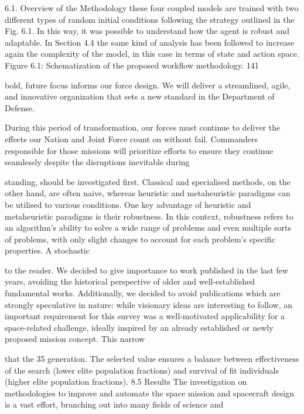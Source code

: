 \documentclass[a4paper,12pt]{article}
\begin{document}
6.1.
Overview of the Methodology
these four coupled models are trained with two different types of random initial
conditions following the strategy outlined in the Fig. 6.1. In this way, it was
possible to understand how the agent is robust and adaptable. In Section 4.4
the same kind of analysis has been followed to increase again the complexity
of the model, in this case in terms of state and action space.
Figure 6.1: Schematization of the proposed workflow methodology.
141

bold, future focus informs our force design. We will 
deliver a streamlined, agile, and innovative organization 
that sets a new standard in the Department of Defense. 
 
During this period of transformation, our forces must 
continue to deliver the effects our Nation and Joint Force 
count on without fail. Commanders responsible for those 
missions will prioritize efforts to ensure they continue 
seamlessly despite the disruptions inevitable during

standing, should be investigated first. Classical and specialised methods, 
on the other hand, are often naive, whereas heuristic and metaheuristic 
paradigms can be utilised to various conditions. One key advantage of 
heuristic and metaheuristic paradigms is their robustness. In this 
context, robustness refers to an algorithm’s ability to solve a wide range 
of problems and even multiple sorts of problems, with only slight 
changes to account for each problem’s specific properties. A stochastic

to the reader. We decided to give importance to work published in the last few years,
avoiding the historical perspective of older and well-established fundamental works.
Additionally, we decided to avoid publications which are strongly speculative in
nature: while visionary ideas are interesting to follow, an important requirement for
this survey was a well-motivated applicability for a space-related challenge, ideally
inspired by an already established or newly proposed mission concept. This narrow

that the 35%
generation. The selected value ensures a balance between effectiveness of the 
search (lower elite population fractions) and survival of fit individuals (higher elite 
population fractions). 
8.5 Results 
The investigation on methodologies to improve and automate the space mission and 
spacecraft design is a vast effort, branching out into many fields of science and
\end{document}
